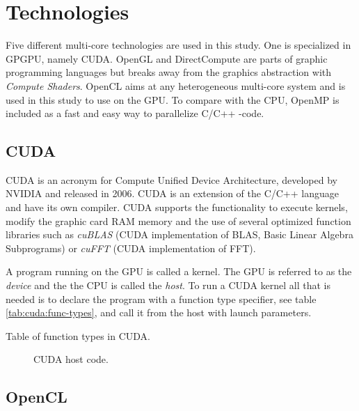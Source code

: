 \chapter{Technologies}

Five different multi-core technologies are used in this study. One is specialized in GPGPU, namely CUDA. OpenGL and DirectCompute are parts of graphic programming languages but breaks away from the graphics abstraction with \textit{Compute Shaders}. OpenCL aims at any heterogeneous multi-core system and is used in this study to use on the GPU. To compare with the CPU, OpenMP is included as a fast and easy way to parallelize C/C++ -code.

\section{CUDA}

CUDA is an acronym for Compute Unified Device Architecture, developed by NVIDIA and released in 2006. CUDA is an extension of the C/C++ language and have its own compiler. CUDA supports the functionality to execute kernels, modify the graphic card RAM memory and the use of several optimized function libraries such as \textit{cuBLAS} (CUDA implementation of BLAS, Basic Linear Algebra Subprograms) or \textit{cuFFT} (CUDA implementation of FFT).

A program running on the GPU is called a kernel. The GPU is referred to as the \textit{device} and the the CPU is called the \textit{host}. To run a CUDA kernel all that is needed is to declare the program with a function type specifier, see table \ref{tab:cuda:func-types}, and call it from the host with launch parameters.

\begin{table}
	\centering
	
	\caption{Table of function types in CUDA.}
	\label{tab:cuda:func-types}
\end{table}

\begin{figure}
	\centering
	\begin{framed}
			
	\end{framed}
	\caption{CUDA host code.}
	\label{lst:cuda:host-example}	
\end{figure}

\section{OpenCL}

